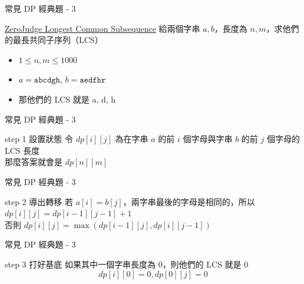 \documentclass[aspectratio=169]{beamer}
\begin{document}
    \begin{frame}{常見 DP 經典題 - 3}
        \begin{block}{\href{https://zerojudge.tw/ShowProblem?problemid=c001}{ZeroJudge Longest Common Subsequence}}
            給兩個字串 $a, b$，長度為 $n, m$，求他們的最長共同子序列（LCS）\\
            \vspace{2.5mm}
            \begin{itemize}
                \item $1 \leq n, m \leq 1000$
            \end{itemize}
        \end{block}
        \begin{itemize}
            \item<2-> $a = \texttt{abcdgh}$, $b = \texttt{aedfhr}$
            \item<2-> 那他們的 LCS 就是 a, d, h
        \end{itemize}
    \end{frame}

    \begin{frame}{常見 DP 經典題 - 3}
        \begin{alertblock}{step 1 設置狀態}
            令 $dp[i][j]$ 為在字串 $a$ 的前 $i$ 個字母與字串 $b$ 的前 $j$ 個字母的 LCS 長度 \\
            \vspace{2mm}
            那麼答案就會是 $dp[n][m]$
        \end{alertblock}
    \end{frame}
    \begin{frame}{常見 DP 經典題 - 3}
        \begin{block}{step 2 導出轉移}
            若 $a[i] = b[j]$，兩字串最後的字母是相同的，所以 $dp[i][j] = dp[i-1][j-1]+1$ \\
            \vspace{2mm}
            否則 $dp[i][j] = \max(dp[i-1][j], dp[i][j-1])$
        \end{block}
    \end{frame}
    \begin{frame}{常見 DP 經典題 - 3}
        \begin{block}{step 3 打好基底}
            如果其中一個字串長度為 $0$，則他們的 LCS 就是 $0$
            $$dp[i][0] = 0, dp[0][j] = 0$$
        \end{block}
    \end{frame}
\end{document}
